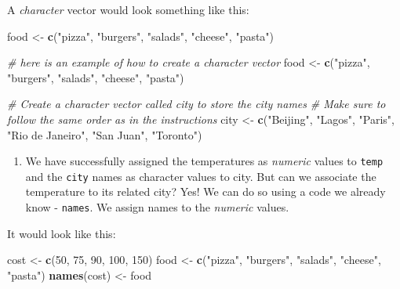 \documentclass[
]{article}
\newenvironment{Shaded}{\begin{snugshade}}{\end{snugshade}}
\newcommand{\CommentTok}[1]{\textcolor[rgb]{0.56,0.35,0.01}{\textit{#1}}}
\newcommand{\DecValTok}[1]{\textcolor[rgb]{0.00,0.00,0.81}{#1}}
\newcommand{\KeywordTok}[1]{\textcolor[rgb]{0.13,0.29,0.53}{\textbf{#1}}}
\newcommand{\NormalTok}[1]{#1}
\newcommand{\StringTok}[1]{\textcolor[rgb]{0.31,0.60,0.02}{#1}}
\providecommand{\tightlist}{%
  \setlength{\itemsep}{0pt}\setlength{\parskip}{0pt}}
\begin{document}
A \emph{character} vector would look something like this:

\begin{Shaded}
\begin{Highlighting}[]
\NormalTok{food <-}\StringTok{ }\KeywordTok{c}\NormalTok{(}\StringTok{"pizza"}\NormalTok{, }\StringTok{"burgers"}\NormalTok{, }\StringTok{"salads"}\NormalTok{, }\StringTok{"cheese"}\NormalTok{, }\StringTok{"pasta"}\NormalTok{)}
\end{Highlighting}
\end{Shaded}

\begin{Shaded}
\begin{Highlighting}[]
\CommentTok{# here is an example of how to create a character vector}
\NormalTok{food <-}\StringTok{ }\KeywordTok{c}\NormalTok{(}\StringTok{"pizza"}\NormalTok{, }\StringTok{"burgers"}\NormalTok{, }\StringTok{"salads"}\NormalTok{, }\StringTok{"cheese"}\NormalTok{, }\StringTok{"pasta"}\NormalTok{)}

\CommentTok{# Create a character vector called city to store the city names}
\CommentTok{# Make sure to follow the same order as in the instructions}
\NormalTok{city <-}\StringTok{ }\KeywordTok{c}\NormalTok{(}\StringTok{"Beijing"}\NormalTok{, }\StringTok{"Lagos"}\NormalTok{, }\StringTok{"Paris"}\NormalTok{, }\StringTok{"Rio de Janeiro"}\NormalTok{, }\StringTok{"San Juan"}\NormalTok{, }\StringTok{"Toronto"}\NormalTok{)}
\end{Highlighting}
\end{Shaded}

\begin{enumerate}
\def\labelenumi{\arabic{enumi}.}
\setcounter{enumi}{2}
\tightlist
\item
  We have successfully assigned the temperatures as \emph{numeric}
  values to \texttt{temp} and the \texttt{city} names as character
  values to city. But can we associate the temperature to its related
  city? Yes! We can do so using a code we already know - \texttt{names}.
  We assign names to the \emph{numeric} values.
\end{enumerate}

It would look like this:

\begin{Shaded}
\begin{Highlighting}[]
\NormalTok{cost <-}\StringTok{ }\KeywordTok{c}\NormalTok{(}\DecValTok{50}\NormalTok{, }\DecValTok{75}\NormalTok{, }\DecValTok{90}\NormalTok{, }\DecValTok{100}\NormalTok{, }\DecValTok{150}\NormalTok{)}
\NormalTok{food <-}\StringTok{ }\KeywordTok{c}\NormalTok{(}\StringTok{"pizza"}\NormalTok{, }\StringTok{"burgers"}\NormalTok{, }\StringTok{"salads"}\NormalTok{, }\StringTok{"cheese"}\NormalTok{, }\StringTok{"pasta"}\NormalTok{)}
\KeywordTok{names}\NormalTok{(cost) <-}\StringTok{ }\NormalTok{food}
\end{Highlighting}
\end{Shaded}
\end{document}
